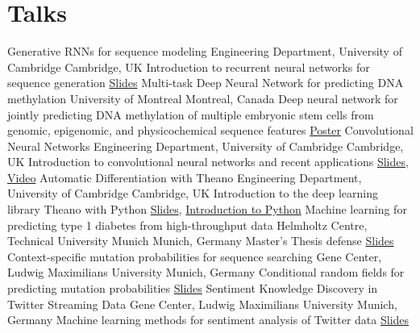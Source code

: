 \documentclass[11pt,a4paper]{moderncv}
\newcommand\chref[3][magenta]{\href{#2}{\small\color{#1}#3}}
\begin{document}
\section{Talks}
         {Generative RNNs for sequence modeling}
         {\hfill\break Engineering Department, University of Cambridge}
         {Cambridge, UK}
         {\hfill\break Introduction to recurrent neural networks for sequence generation}
         {\chref{https://cangermueller.com/wp-content/uploads/2016/01/160121_rnn.pdf}{Slides}}
         {Multi-task Deep Neural Network for predicting DNA methylation}
         {\hfill\break University of Montreal}
         {Montreal, Canada}
         {\hfill\break Deep neural network for jointly predicting DNA methylation of multiple embryonic stem cells from genomic, epigenomic, and physicochemical sequence features}
         {\chref{https://cangermueller.com/wp-content/uploads/2015/08/150803_poster_dlss.pdf}{Poster}}
         {Convolutional Neural Networks}
         {\hfill\break Engineering Department, University of Cambridge}
         {Cambridge, UK}
         {\hfill\break Introduction to convolutional neural networks and recent applications}
         {\chref{https://cangermueller.com/wp-content/uploads/2015/06/150521_cnn.pdf}{Slides},
          \chref{https://www.youtube.com/watch?v=Hr92S0Sv_zY}{Video}}
         {Automatic Differentiation with Theano}
         {\hfill\break Engineering Department, University of Cambridge}
         {Cambridge, UK}
         {\hfill\break Introduction to the deep learning library Theano with Python}
         {\chref{https://cangermueller.com/wp-content/uploads/2015/01/141113_theano.pdf}{Slides},
          \chref{https://github.com/cangermueller/python_lecture}{Introduction to Python}}
         {Machine learning for predicting type 1 diabetes from high-throughput data}
         {\hfill\break Helmholtz Centre, Technical University Munich}
         {Munich, Germany}
         {\hfill\break Master's Thesis defense}
         {\chref{https://cangermueller.com/wp-content/uploads/2015/01/130918_t1d.pdf}{Slides}}
         {Context-specific mutation probabilities for sequence searching}
         {\hfill\break Gene Center, Ludwig Maximilians University}
         {Munich, Germany}
         {\hfill\break Conditional random fields for predicting mutation probabilities}
         {\chref{https://cangermueller.com/wp-content/uploads/2015/01/121220_csblast.pdf}{Slides}}
         {Sentiment Knowledge Discovery in Twitter Streaming Data}
         {\hfill\break Gene Center, Ludwig Maximilians University}
         {Munich, Germany}
         {\hfill\break Machine learning methods for sentiment analysis of Twitter data}
         {\chref{https://cangermueller.com/wp-content/uploads/2015/01/121114_twitter.pdf}{Slides}}
\end{document}
